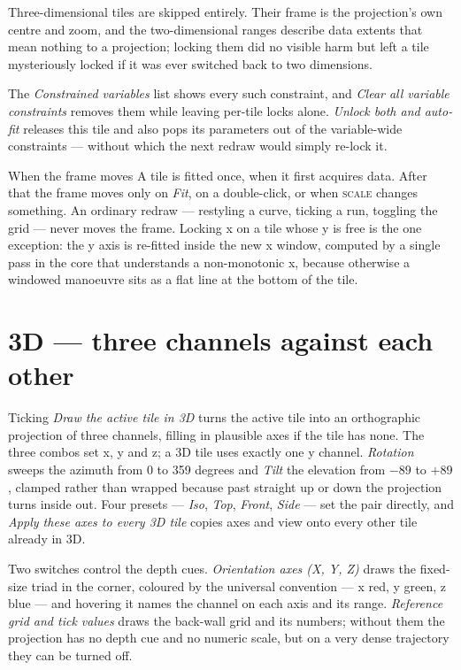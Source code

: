 \documentclass[11pt,a4paper,oneside]{report}
\newcommand{\tab}[1]{\textsc{#1}}
\begin{document}
Three-dimensional tiles are skipped entirely. Their frame is the projection's own
centre and zoom, and the two-dimensional ranges describe data extents that mean
nothing to a projection; locking them did no visible harm but left a tile
mysteriously locked if it was ever switched back to two dimensions.

The \emph{Constrained variables} list shows every such constraint, and \emph{Clear
all variable constraints} removes them while leaving per-tile locks alone.
\emph{Unlock both and auto-fit} releases this tile and also pops its parameters
out of the variable-wide constraints --- without which the next redraw would
simply re-lock it.

\begin{aoenote}{When the frame moves}
A tile is fitted once, when it first acquires data. After that the frame moves
only on \emph{Fit}, on a double-click, or when \tab{scale} changes something. An
ordinary redraw --- restyling a curve, ticking a run, toggling the grid --- never
moves the frame. Locking x on a tile whose y is free is the one exception: the y
axis is re-fitted inside the new x window, computed by a single pass in the core
that understands a non-monotonic x, because otherwise a windowed manoeuvre sits
as a flat line at the bottom of the tile.
\end{aoenote}

\section{3D --- three channels against each other}

Ticking \emph{Draw the active tile in 3D} turns the active tile into an
orthographic projection of three channels, filling in plausible axes if the tile
has none. The three combos set x, y and z; a 3D tile uses exactly one y channel.
\emph{Rotation} sweeps the azimuth from 0 to 359 degrees and \emph{Tilt} the
elevation from $-89$ to $+89$, clamped rather than wrapped because past straight
up or down the projection turns inside out. Four presets --- \emph{Iso},
\emph{Top}, \emph{Front}, \emph{Side} --- set the pair directly, and \emph{Apply
these axes to every 3D tile} copies axes and view onto every other tile already
in 3D.

Two switches control the depth cues. \emph{Orientation axes (X, Y, Z)} draws the
fixed-size triad in the corner, coloured by the universal convention --- x red, y
green, z blue --- and hovering it names the channel on each axis and its range.
\emph{Reference grid and tick values} draws the back-wall grid and its numbers;
without them the projection has no depth cue and no numeric scale, but on a very
dense trajectory they can be turned off.
\end{document}
